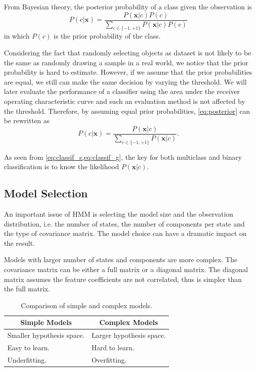 \documentclass[letterpaper, 10 pt, conference]{ieeeconf}
\begin{document}
From Bayesian theory, the posterior probability of a class given the observation is
\begin{equation} \label{eq:posterior}
  P(c|\mathbf{x}) = \frac{P(\mathbf{x}|c)P(c)}{\sum_{c \in \{-1,+1\}} P(\mathbf{x}|c)P(c)}
\end{equation}
in which $P(c)$ is the prior probability of the class.

Considering the fact that randomly selecting objects as dataset is not likely to be the same as randomly drawing a sample in a real world, we notice that the prior probability is hard to estimate. However, if we assume that the prior probabilities are equal, we still can make the same decision by varying the threshold. We will later evaluate the performance of a classifier using the area under the receiver operating characteristic curve and such an evaluation method is not affected by the threshold. Therefore, by assuming equal prior probabilities, \cref{eq:posterior} can be rewritten as
\begin{equation}
  \label{eq:postsimp}
  P(c|\mathbf{x}) = \frac{P(\mathbf{x}|c)}{\sum_{c \in \{-1,+1\}} P(\mathbf{x}|c)} .
\end{equation}

As seen from \cref{eq:classif_s,eq:classif_g}, the key for both multiclass and binary classification is to know the likelihood $P(\mathbf{x}|c)$.

\subsection{Model Selection}
An important issue of HMM is selecting the model size and the observation distribution, i.e. the number of states, the number of components per state and the type of covariance matrix. The model choice can have a dramatic impact on the result.

Models with larger number of states and components are more complex. The covariance matrix can be either a full matrix or a diagonal matrix. The diagonal matrix assumes the feature coefficients are not correlated, thus is simpler than the full matrix.

\begin{table}[t]
  \caption{Comparison of simple and complex models.}
  \label{tab:model}
  \centering
  \begin{tabular}{p{.42\linewidth}p{.42\linewidth}}
    \toprule
    \multicolumn{1}{c}{\bfseries Simple Models} & \multicolumn{1}{c}{\bfseries Complex Models} \\ \midrule
    Smaller hypothesis space. & Larger hypothesis space. \\
    Easy to learn. & Hard to learn. \\
    Underfitting. & Overfitting. \\
    \bottomrule
  \end{tabular}
\end{table}
\end{document}
